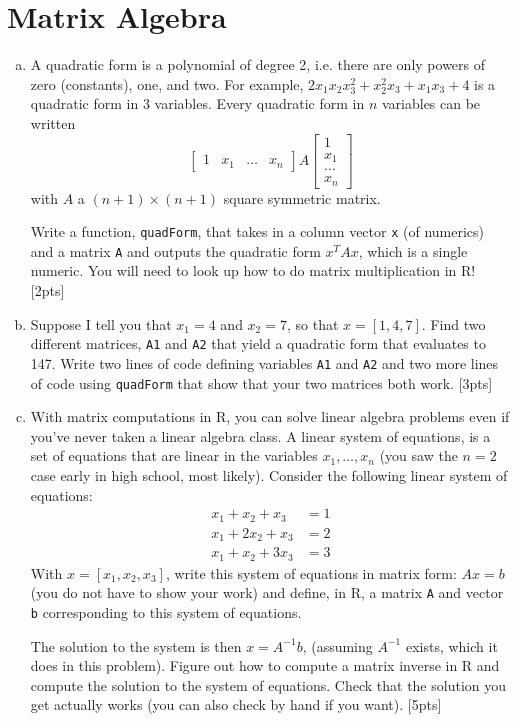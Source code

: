\documentclass[12pt]{article}
\begin{document}
\section{Matrix Algebra}

\begin{enumerate}[(a)]
	\item A quadratic form is a polynomial of degree 2, i.e. there are only powers of zero (constants), one, and two. For example, $2x_1x_2x_3^2 + x_2^2x_3 + x_1x_3 + 4$ is a quadratic form in 3 variables. Every quadratic form in $n$ variables can be written
	\[
	\begin{bmatrix}
	1 & x_1 & \ldots & x_n
	\end{bmatrix}
	A
	\begin{bmatrix}
	1 \\ x_1 \\ \ldots \\ x_n
	\end{bmatrix}
	\]
	with $A$ a $(n+1) \times (n+1)$ square symmetric matrix.
	
	Write a function, \verb|quadForm|, that takes in a column vector \verb|x| (of numerics) and a matrix \verb|A| and outputs the quadratic form $x^T A x$, which is a single numeric. You will need to look up how to do matrix multiplication in R! [2pts]
	\item Suppose I tell you that $x_1 = 4$ and $x_2 = 7$, so that $x = [1,4,7]$. Find two different matrices, \verb|A1| and \verb|A2| that yield a quadratic form that evaluates to 147. Write two lines of code defining variables \verb|A1| and \verb|A2| and two more lines of code using \verb|quadForm| that show that your two matrices both work. [3pts]
	\item With matrix computations in R, you can solve linear algebra problems even if you've never taken a linear algebra class. A linear system of equations, is a set of equations that are linear in the variables $x_1,\ldots,x_n$ (you saw the $n=2$ case early in high school, most likely). Consider the following linear system of equations:
	\begin{align*}
	x_1 + x_2 + x_3 &= 1 \\
	x_1 + 2x_2 + x_3 &= 2 \\
	x_1 + x_2 + 3x_3 &= 3
	\end{align*}
	With $x = [x_1,x_2,x_3]$, write this system of equations in matrix form: $Ax = b$ (you do not have to show your work) and define, in R, a matrix \verb|A| and vector \verb|b| corresponding to this system of equations.
	
	The solution to the system is then $x = A^{-1}b$, (assuming $A^{-1}$ exists, which it does in this problem). Figure out how to compute a matrix inverse in R and compute the solution to the system of equations. Check that the solution you get actually works (you can also check by hand if you want). [5pts]
\end{enumerate}
\end{document}
